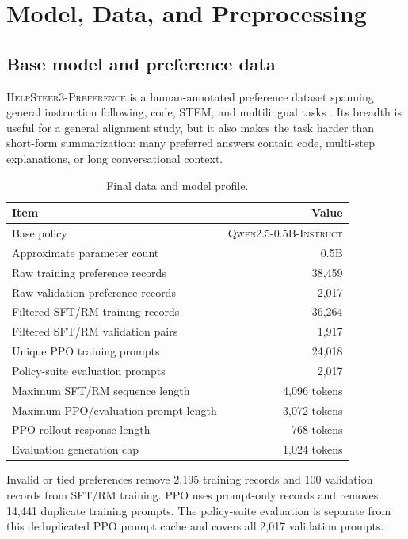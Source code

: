 \documentclass[11pt]{article}
\newcommand{\model}{\textsc{Qwen2.5-0.5B-Instruct}}
\newcommand{\dataset}{\textsc{HelpSteer3-Preference}}
\begin{document}
\section{Model, Data, and Preprocessing}

\subsection{Base model and preference data}

\dataset{} is a human-annotated preference dataset spanning general
instruction following, code, STEM, and multilingual tasks
\cite{wang2025}. Its breadth is useful for a general alignment study, but it
also makes the task harder than short-form summarization: many preferred
answers contain code, multi-step explanations, or long conversational context.

\begin{table}[H]
\centering
\caption{Final data and model profile.}
\label{tab:data-profile}
\begin{tabularx}{0.88\textwidth}{@{}Y r@{}}
\toprule
\textbf{Item} & \textbf{Value}\\
\midrule
Base policy & \model{}\\
Approximate parameter count & 0.5B\\
Raw training preference records & 38,459\\
Raw validation preference records & 2,017\\
Filtered SFT/RM training records & 36,264\\
Filtered SFT/RM validation pairs & 1,917\\
Unique PPO training prompts & 24,018\\
Policy-suite evaluation prompts & 2,017\\
Maximum SFT/RM sequence length & 4,096 tokens\\
Maximum PPO/evaluation prompt length & 3,072 tokens\\
PPO rollout response length & 768 tokens\\
Evaluation generation cap & 1,024 tokens\\
\bottomrule
\end{tabularx}
\end{table}

Invalid or tied preferences remove 2,195 training records and 100 validation
records from SFT/RM training. PPO uses prompt-only records and removes 14,441
duplicate training prompts. The policy-suite evaluation is separate from this
deduplicated PPO prompt cache and covers all 2,017 validation prompts.
\end{document}
